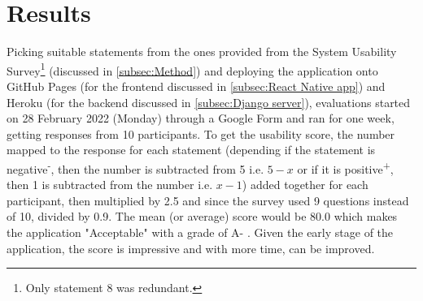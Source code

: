 \documentclass[../main.tex]{subfiles}
\begin{document}
\section{Results}

Picking suitable statements from the ones provided from the System Usability Survey\footnote{Only statement 8 was redundant.} (discussed in \ref{subsec:Method}) and deploying the application onto GitHub Pages (for the frontend discussed in \ref{subsec:React Native app}) and Heroku (for the backend discussed in \ref{subsec:Django server}), evaluations started on 28 February 2022 (Monday) through a Google Form and ran for one week, getting responses from 10 participants. To get the usability score, the number mapped to the response for each statement (depending if the statement is negative\textsuperscript{-}, then the number is subtracted from 5 i.e. $5 - x$ or if it is positive\textsuperscript{+}, then 1 is subtracted from the number i.e. $x - 1$) added together for each participant, then multiplied by 2.5 and since the survey used 9 questions instead of 10, divided by 0.9. The mean (or average) score would be 80.0 which makes the application "Acceptable" with a grade of A- \cite{phdWaysInterpretSUS,SystemUsabilityScale}. Given the early stage of the application, the score is impressive and with more time, can be improved.
\end{document}
